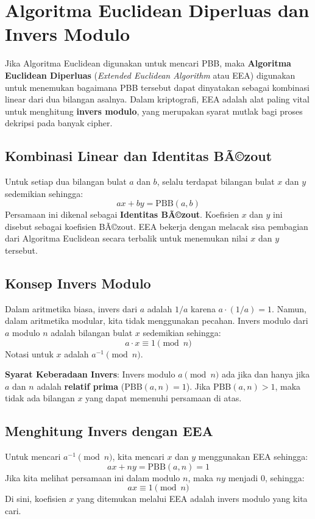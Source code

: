 \section{Algoritma Euclidean Diperluas dan Invers Modulo}

Jika Algoritma Euclidean digunakan untuk mencari PBB, maka \textbf{Algoritma Euclidean Diperluas} (\textit{Extended Euclidean Algorithm} atau EEA) digunakan untuk menemukan bagaimana PBB tersebut dapat dinyatakan sebagai kombinasi linear dari dua bilangan asalnya. Dalam kriptografi, EEA adalah alat paling vital untuk menghitung \textbf{invers modulo}, yang merupakan syarat mutlak bagi proses dekripsi pada banyak cipher.

\subsection{Kombinasi Linear dan Identitas BÃ©zout}

Untuk setiap dua bilangan bulat $a$ dan $b$, selalu terdapat bilangan bulat $x$ dan $y$ sedemikian sehingga:
\[ ax + by = \text{PBB}(a, b) \]
Persamaan ini dikenal sebagai \textbf{Identitas BÃ©zout}. Koefisien $x$ dan $y$ ini disebut sebagai koefisien BÃ©zout. EEA bekerja dengan melacak sisa pembagian dari Algoritma Euclidean secara terbalik untuk menemukan nilai $x$ dan $y$ tersebut.

\subsection{Konsep Invers Modulo}

Dalam aritmetika biasa, invers dari $a$ adalah $1/a$ karena $a \cdot (1/a) = 1$. Namun, dalam aritmetika modular, kita tidak menggunakan pecahan. Invers modulo dari $a$ modulo $n$ adalah bilangan bulat $x$ sedemikian sehingga:
\[ a \cdot x \equiv 1 \pmod{n} \]
Notasi untuk $x$ adalah $a^{-1} \pmod{n}$.

\textbf{Syarat Keberadaan Invers}:
Invers modulo $a \pmod{n}$ ada jika dan hanya jika $a$ dan $n$ adalah \textbf{relatif prima} ($\text{PBB}(a, n) = 1$). Jika $\text{PBB}(a, n) > 1$, maka tidak ada bilangan $x$ yang dapat memenuhi persamaan di atas.

\subsection{Menghitung Invers dengan EEA}

Untuk mencari $a^{-1} \pmod{n}$, kita mencari $x$ dan $y$ menggunakan EEA sehingga:
\[ ax + ny = \text{PBB}(a, n) = 1 \]
Jika kita melihat persamaan ini dalam modulo $n$, maka $ny$ menjadi $0$, sehingga:
\[ ax \equiv 1 \pmod{n} \]
Di sini, koefisien $x$ yang ditemukan melalui EEA adalah invers modulo yang kita cari.

